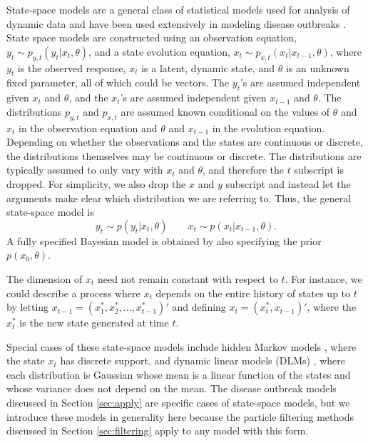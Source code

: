 \documentclass{elsarticle}
\begin{document}
State-space models are a general class of statistical models used for analysis of dynamic data and have been used extensively in modeling disease outbreaks \citep{Mart:Cone:Lope:Lope:baye:2008,watkins2009disease,merl2009statistical,ludkovski2010optimal,skvortsov2012monitoring}.  State space models are constructed using an observation equation, $y_t \sim p_{y,t}(y_t|x_t,\theta)$, and a state evolution equation, $x_t \sim p_{x,t}(x_t|x_{t-1},\theta)$, where $y_t$ is the observed response, $x_t$ is a latent, dynamic state, and $\theta$ is an unknown fixed parameter, all of which could be vectors. The $y_t$'s are assumed independent given $x_t$ and $\theta$, and the $x_t$'s are assumed independent given $x_{t-1}$ and $\theta$. The distributions $p_{y,t}$ and $p_{x,t}$ are assumed known conditional on the values of $\theta$ and $x_t$ in the observation equation and $\theta$ and $x_{t-1}$ in the evolution equation. Depending on whether the observations and the states are continuous or discrete, the distributions themselves may be continuous or discrete. The distributions are typically assumed to only vary with $x_t$ and $\theta$, and therefore the $t$ subscript is dropped. For simplicity, we also drop the $x$ and $y$ subscript and instead let the arguments make clear which distribution we are referring to. Thus, the general state-space model is
\[
y_t \sim p(y_t|x_t,\theta) \qquad
x_t \sim p(x_t|x_{t-1},\theta).
\]
A fully specified Bayesian model is obtained by also specifying the prior $p(x_0,\theta)$.

The dimension of $x_t$ need not remain constant with respect to $t$. For instance, we could describe a process where $x_t$ depends on the entire history of states up to $t$ by letting $x_{t-1} = (x^*_1, x^*_2, \ldots, x^*_{t-1})'$ and defining $x_t = (x^*_t, x_{t-1})'$, where the $x^*_t$ is the new state generated at time $t$.

Special cases of these state-space models include hidden Markov models \citep{cappe2005inference,petris2009dynamic}, where the state $x_t$ has discrete support, and dynamic linear models (DLMs) \citep{West:Harr:baye:1997}, where each distribution is Gaussian whose mean is a linear function of the states and whose variance does not depend on the mean. The disease outbreak models discussed in Section \ref{sec:apply} are specific cases of state-space models, but we introduce these models in generality here because the particle filtering methods discussed in Section \ref{sec:filtering} apply to any model with this form.
\end{document}
